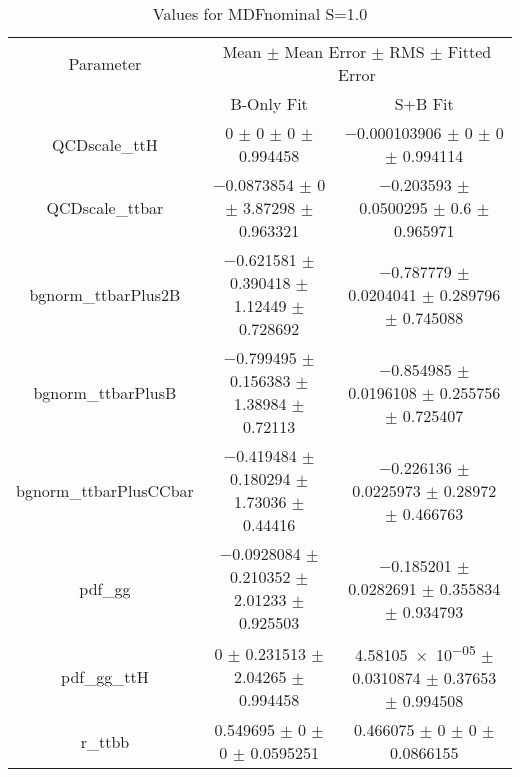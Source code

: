 \begin{table}
\centering
\caption{Values for MDFnominal S=1.0}
\begin{tabular}{ccc}
\toprule
Parameter & \multicolumn{2}{c}{Mean $\pm$ Mean Error $\pm$ RMS $\pm$ Fitted Error}\\
 & B-Only Fit & S+B Fit\\
\midrule
QCDscale\_ttH & \num{0} $\pm$ \num{0} $\pm$ \num{0} $\pm$ \num{0.994458} & \num{-0.000103906} $\pm$ \num{0} $\pm$ \num{0} $\pm$ \num{0.994114}\\
QCDscale\_ttbar & \num{-0.0873854} $\pm$ \num{0} $\pm$ \num{3.87298} $\pm$ \num{0.963321} & \num{-0.203593} $\pm$ \num{0.0500295} $\pm$ \num{0.6} $\pm$ \num{0.965971}\\
bgnorm\_ttbarPlus2B & \num{-0.621581} $\pm$ \num{0.390418} $\pm$ \num{1.12449} $\pm$ \num{0.728692} & \num{-0.787779} $\pm$ \num{0.0204041} $\pm$ \num{0.289796} $\pm$ \num{0.745088}\\
bgnorm\_ttbarPlusB & \num{-0.799495} $\pm$ \num{0.156383} $\pm$ \num{1.38984} $\pm$ \num{0.72113} & \num{-0.854985} $\pm$ \num{0.0196108} $\pm$ \num{0.255756} $\pm$ \num{0.725407}\\
bgnorm\_ttbarPlusCCbar & \num{-0.419484} $\pm$ \num{0.180294} $\pm$ \num{1.73036} $\pm$ \num{0.44416} & \num{-0.226136} $\pm$ \num{0.0225973} $\pm$ \num{0.28972} $\pm$ \num{0.466763}\\
pdf\_gg & \num{-0.0928084} $\pm$ \num{0.210352} $\pm$ \num{2.01233} $\pm$ \num{0.925503} & \num{-0.185201} $\pm$ \num{0.0282691} $\pm$ \num{0.355834} $\pm$ \num{0.934793}\\
pdf\_gg\_ttH & \num{0} $\pm$ \num{0.231513} $\pm$ \num{2.04265} $\pm$ \num{0.994458} & \num{4.58105e-05} $\pm$ \num{0.0310874} $\pm$ \num{0.37653} $\pm$ \num{0.994508}\\
r\_ttbb & \num{0.549695} $\pm$ \num{0} $\pm$ \num{0} $\pm$ \num{0.0595251} & \num{0.466075} $\pm$ \num{0} $\pm$ \num{0} $\pm$ \num{0.0866155}\\
\bottomrule
\end{tabular}
\end{table}